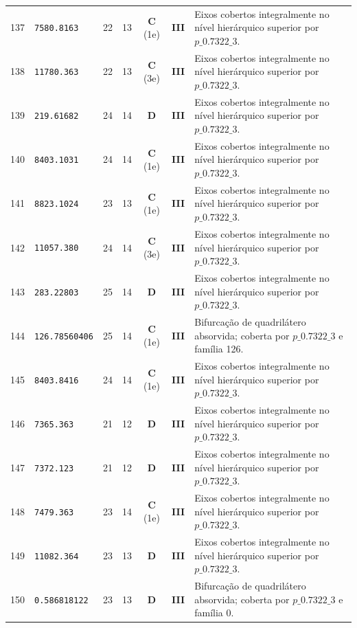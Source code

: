\documentclass[11pt,a4paper]{article}
\begin{document}
\begin{small}
\begin{longtable}{r l c c c c p{8.8cm}}
137 & \texttt{7580.8163} & 22 & 13 & \textbf{C} (1e) & \textbf{III} & Eixos cobertos integralmente no nível hierárquico superior por $p\_0.7322\_3$. \\
138 & \texttt{11780.363} & 22 & 13 & \textbf{C} (3e) & \textbf{III} & Eixos cobertos integralmente no nível hierárquico superior por $p\_0.7322\_3$. \\
139 & \texttt{219.61682} & 24 & 14 & \textbf{D} & \textbf{III} & Eixos cobertos integralmente no nível hierárquico superior por $p\_0.7322\_3$. \\
140 & \texttt{8403.1031} & 24 & 14 & \textbf{C} (1e) & \textbf{III} & Eixos cobertos integralmente no nível hierárquico superior por $p\_0.7322\_3$. \\
141 & \texttt{8823.1024} & 23 & 13 & \textbf{C} (1e) & \textbf{III} & Eixos cobertos integralmente no nível hierárquico superior por $p\_0.7322\_3$. \\
142 & \texttt{11057.380} & 24 & 14 & \textbf{C} (3e) & \textbf{III} & Eixos cobertos integralmente no nível hierárquico superior por $p\_0.7322\_3$. \\
143 & \texttt{283.22803} & 25 & 14 & \textbf{D} & \textbf{III} & Eixos cobertos integralmente no nível hierárquico superior por $p\_0.7322\_3$. \\
144 & \texttt{126.78560406} & 25 & 14 & \textbf{C} (1e) & \textbf{III} & Bifurcação de quadrilátero absorvida; coberta por $p\_0.7322\_3$ e família 126. \\
145 & \texttt{8403.8416} & 24 & 14 & \textbf{C} (1e) & \textbf{III} & Eixos cobertos integralmente no nível hierárquico superior por $p\_0.7322\_3$. \\
146 & \texttt{7365.363} & 21 & 12 & \textbf{D} & \textbf{III} & Eixos cobertos integralmente no nível hierárquico superior por $p\_0.7322\_3$. \\
147 & \texttt{7372.123} & 21 & 12 & \textbf{D} & \textbf{III} & Eixos cobertos integralmente no nível hierárquico superior por $p\_0.7322\_3$. \\
148 & \texttt{7479.363} & 23 & 14 & \textbf{C} (1e) & \textbf{III} & Eixos cobertos integralmente no nível hierárquico superior por $p\_0.7322\_3$. \\
149 & \texttt{11082.364} & 23 & 13 & \textbf{D} & \textbf{III} & Eixos cobertos integralmente no nível hierárquico superior por $p\_0.7322\_3$. \\
150 & \texttt{0.586818122} & 23 & 13 & \textbf{D} & \textbf{III} & Bifurcação de quadrilátero absorvida; coberta por $p\_0.7322\_3$ e família 0. \\

\end{longtable}
\end{small}
\end{document}
